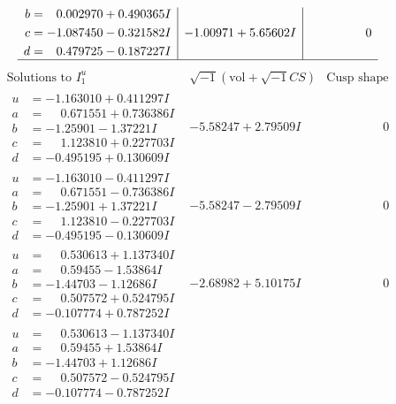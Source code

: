 \documentclass[1p]{elsarticle_modified}
\theoremstyle{definition}
\newcommand{\I}{\sqrt{-1}}
\begin{document}
$$\begin{array}{c|c|c}
\begin{aligned}
b &= \phantom{-}0.002970 + 0.490365 I \\
c &= -1.087450 - 0.321582 I \\
d &= \phantom{-}0.479725 - 0.187227 I\end{aligned}
 & -1.00971 + 5.65602 I & \phantom{-0.000000 } 0\\
 \hline 
 \end{array}$$\newpage$$\begin{array}{c|c|c}  
\text{Solutions to }I^u_{1}& \I (\text{vol} + \sqrt{-1}CS) & \text{Cusp shape}\\
 \hline 
\begin{aligned}
u &= -1.163010 + 0.411297 I \\
a &= \phantom{-}0.671551 + 0.736386 I \\
b &= -1.25901 - 1.37221 I \\
c &= \phantom{-}1.123810 + 0.227703 I \\
d &= -0.495195 + 0.130609 I\end{aligned}
 & -5.58247 + 2.79509 I & \phantom{-0.000000 } 0 \\ \hline\begin{aligned}
u &= -1.163010 - 0.411297 I \\
a &= \phantom{-}0.671551 - 0.736386 I \\
b &= -1.25901 + 1.37221 I \\
c &= \phantom{-}1.123810 - 0.227703 I \\
d &= -0.495195 - 0.130609 I\end{aligned}
 & -5.58247 - 2.79509 I & \phantom{-0.000000 } 0 \\ \hline\begin{aligned}
u &= \phantom{-}0.530613 + 1.137340 I \\
a &= \phantom{-}0.59455 - 1.53864 I \\
b &= -1.44703 - 1.12686 I \\
c &= \phantom{-}0.507572 + 0.524795 I \\
d &= -0.107774 + 0.787252 I\end{aligned}
 & -2.68982 + 5.10175 I & \phantom{-0.000000 } 0 \\ \hline\begin{aligned}
u &= \phantom{-}0.530613 - 1.137340 I \\
a &= \phantom{-}0.59455 + 1.53864 I \\
b &= -1.44703 + 1.12686 I \\
c &= \phantom{-}0.507572 - 0.524795 I \\
d &= -0.107774 - 0.787252 I\end{aligned}

\end{array}$$
\end{document}
